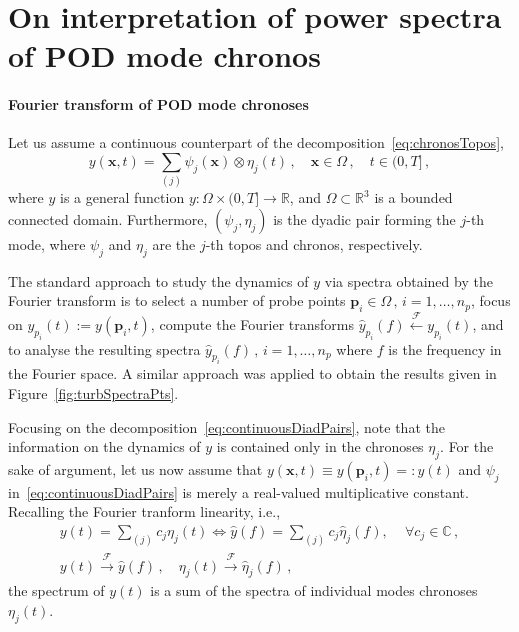 \section{On interpretation of power spectra of POD mode chronos}
\label{app:fourier}
\paragraph{Fourier transform of POD mode chronoses}
Let us assume a continuous counterpart of the decomposition~\eqref{eq:chronosTopos},
\begin{equation}
\label{eq:continuousDiadPairs}
    y(\bm{x},t) = \sum\limits_{(j)}\psi_{j}(\bm{x})\otimes \eta_{j}(t)\,,\quad \bm{x}\in\Omega\,,\quad t\in (0,T]\,,
\end{equation}
where $y$ is a general function $y:\Omega\times (0,T] \rightarrow \mathbb{R}$, and $\Omega\subset \mathbb{R}^{3}$ is a bounded connected domain. Furthermore, $(\psi_{j},\eta_{j})$ is the dyadic pair forming the $j$-th mode, where $\psi_{j}$ and $\eta_{j}$ are the $j$-th topos and chronos, respectively.

The standard approach to study the dynamics of $y$ via spectra obtained by the Fourier transform is to select a number of probe points $\bm{p}_{i}\in\Omega\,,\,i=1,\dots,n_{p}$, focus on $y_{p_{i}}(t):=y(\bm{p}_{i},t)$, compute the Fourier transforms $\hat{y}_{p_{i}}(f)\xleftarrow{\mathcal{F}} y_{p_{i}}(t)$, and to analyse the resulting spectra $\hat{y}_{p_{i}}(f)\,,\,i=1,\dots,n_{p}$ where $f$ is the frequency in the Fourier space. A similar approach was applied to obtain the results given in Figure~\ref{fig:turbSpectraPts}.

Focusing on the decomposition~\eqref{eq:continuousDiadPairs}, note that the information on the dynamics of $y$ is contained only in the chronoses $\eta_{j}$. For the sake of argument, let us now assume that $y(\bm{x},t) \equiv y(\bm{p}_{i},t) =: y(t)$ and $\psi_{j}$ in~\eqref{eq:continuousDiadPairs} is merely a real-valued multiplicative constant. Recalling the Fourier tranform linearity, i.e.,
\begin{equation}
\label{eq:fourierLin}
    \begin{array}{c}
        \displaystyle y(t) = \sum\limits_{(j)}c_{j}\eta_{j}(t) \iff \hat{y}(f) = \sum\limits_{(j)}c_{j}\hat{\eta}_{j}(f),\,\quad\forall c_{j}\in\mathbb{C}\,,\\[0.4cm]
        y(t) \xrightarrow{\mathcal{F}} \hat{y}(f)\,,\quad\eta_{j}(t) \xrightarrow{\mathcal{F}} \hat{\eta}_{j}(f)\,,
    \end{array}
\end{equation}
the spectrum of $y(t)$ is a sum of the spectra of individual modes chronoses $\eta_{j}(t)$.

